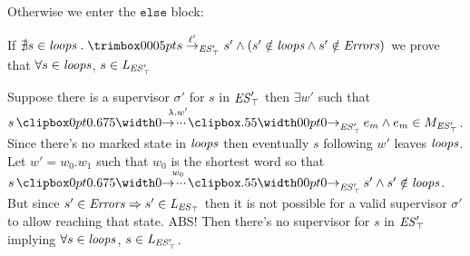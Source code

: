 Otherwise we enter the $\texttt{else}$ block:

If $\nexists s \in \SCC \ldot \trimlst{s \step{\l'}{\unexploredToTop{\structure'}}  s'} \wedge (s' \notin \SCC \wedge s' \notin \Errors)$ we prove that $\forall s \in \mathit{loops}$, $s \in \mathit{L_{\mathit{\mathit{ES}'_{\top}}}}$

Suppose there is a supervisor $\sigma'$ for $s$ in $\mathit{\mathit{ES}'_{\top}}$ then $\exists w'$ such that $s \runw{\lambda.w'}{\unexploredToTop{\structure'}} e_m \wedge e_m \in M_{\unexploredToTop{\structure'}}$. Since there's no marked state in $\mathit{loops}$ then eventually $s$ following $w'$ leaves $\mathit{loops}$. \\
Let $w' = w_0.w_1$ such that $w_0$ is the shortest word so that $s \runw{w_0}{\unexploredToTop{\structure'}} s' \wedge s' \notin \SCC$. But since $s'\in \mathit{Errors} \Rightarrow s' \in \mathit{L_{\mathit{\mathit{ES}_{\top}}}}$ then it is not possible for a valid supervisor $\sigma'$ to allow reaching that state. ABS! Then there's no supervisor for $s$ in $\mathit{\mathit{ES}'_{\top}}$ implying $\forall s \in \mathit{loops}$, $s \in \mathit{L_{\mathit{\mathit{ES}'_{\top}}}}$.